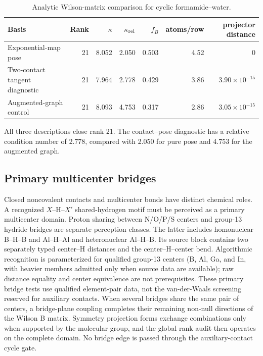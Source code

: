 \documentclass[10pt]{article}
\begin{document}
\begin{table}[htbp]
\centering
\small
\caption{Analytic Wilson-matrix comparison for cyclic formamide--water.}
\label{tab:si-formamide-closed}
\begin{tabular}{@{}lrrrrrr@{}}
\toprule
Basis & Rank & \(\kappa\) & \(\kappa_{\rm rel}\) & \(f_B\) & atoms/row & projector distance \\
\midrule
Exponential-map pose & 21 & 8.052 & 2.050 & 0.503 & 4.52 & 0 \\
Two-contact tangent diagnostic & 21 & 7.964 & 2.778 & 0.429 & 3.86 & \(3.90\times10^{-15}\) \\
{Augmented-graph control} & 21 & 8.093 & 4.753 & 0.317 & 2.86 & \(3.05\times10^{-15}\) \\
\bottomrule
\end{tabular}
\end{table}

{All three descriptions close rank 21.  The contact--pose
diagnostic has a relative condition number of 2.778, compared with 2.050 for
pure pose and 4.753 for the augmented graph.}

\subsection{Primary multicenter bridges}

Closed noncovalent contacts and multicenter bonds have distinct chemical roles.  A recognized \(X\)--H--\(X'\) shared-hydrogen motif must be perceived
as a primary multicenter domain.  Proton
sharing between N/O/P/S centers and group-13 hydride bridges are separate
perception classes.  The latter includes homonuclear B--H--B and Al--H--Al and
heteronuclear Al--H--B.  Its source block contains two separately typed
center--H distances and the center--H--center bend.  Algorithmic recognition
is parameterized for qualified group-13 centers (B, Al, Ga, and In, with
heavier members admitted only when source data are available); raw distance equality and
center equivalence are not prerequisites.  These primary bridge tests use
qualified element-pair data, not the van-der-Waals screening reserved for
auxiliary contacts.  When several bridges share the same
pair of centers, a bridge-plane coupling completes their {remaining non-null directions of the Wilson B matrix}.
Symmetry projection forms exchange combinations only when supported by the
molecular group, and the global rank audit then operates on the complete
domain.  No bridge edge is passed through the auxiliary-contact cycle gate.
\end{document}
